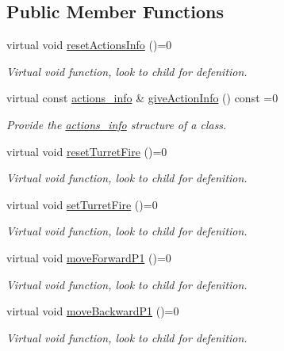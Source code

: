\subsection*{Public Member Functions}
\begin{DoxyCompactItemize}
\item 
virtual void \hyperlink{classActionData_aede7cfa65182cda2a2d43df11ccf2183}{reset\-Actions\-Info} ()=0
\begin{DoxyCompactList}\small\item\em Virtual void function, look to child for defenition. \end{DoxyCompactList}\item 
virtual const \hyperlink{structactions__info}{actions\-\_\-info} \& \hyperlink{classActionData_ab2f5b210968c91a01ed1439904b3ffee}{give\-Action\-Info} () const =0
\begin{DoxyCompactList}\small\item\em Provide the \hyperlink{structactions__info}{actions\-\_\-info} structure of a class. \end{DoxyCompactList}\item 
virtual void \hyperlink{classActionData_a043baaefa338dd8027ee3eec10f47e44}{reset\-Turret\-Fire} ()=0
\begin{DoxyCompactList}\small\item\em Virtual void function, look to child for defenition. \end{DoxyCompactList}\item 
virtual void \hyperlink{classActionData_a30502665240f4a0b0e37fbcd6447b590}{set\-Turret\-Fire} ()=0
\begin{DoxyCompactList}\small\item\em Virtual void function, look to child for defenition. \end{DoxyCompactList}\item 
virtual void \hyperlink{classActionData_a002859569085e9868adb7beabd3a2ad8}{move\-Forward\-P1} ()=0
\begin{DoxyCompactList}\small\item\em Virtual void function, look to child for defenition. \end{DoxyCompactList}\item 
virtual void \hyperlink{classActionData_a711265f479e845086896c42d1e906c57}{move\-Backward\-P1} ()=0
\begin{DoxyCompactList}\small\item\em Virtual void function, look to child for defenition. \end{DoxyCompactList}\item 

\end{DoxyCompactItemize}
